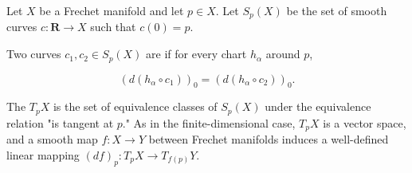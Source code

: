 Let $X$ be a Frechet manifold and let $p \in X$. Let $S_p(X)$ be the set of smooth curves $c: \mathbf{R} \to X$ such that $c(0) = p$.

Two curves $c_1, c_2 \in S_p(X)$ are  if for every chart $h_\alpha$ around $p$,

$$
(d(h_\alpha \circ c_1))_0 = (d(h_\alpha \circ c_2))_0.
$$

The  $T_p X$ is the set of equivalence classes of $S_p(X)$ under the equivalence relation "is tangent at $p$." As in the finite-dimensional case, $T_p X$ is a vector space, and a smooth map $f: X \to Y$ between Frechet manifolds induces a well-defined linear mapping $(df)_p: T_p X \to T_{f(p)} Y$.
